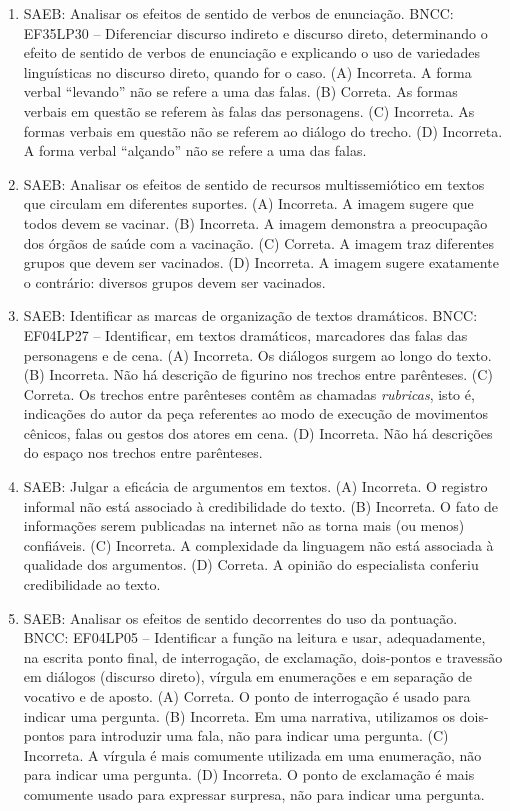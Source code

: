 \begin{enumerate}
\item
SAEB: Analisar os efeitos de sentido de verbos de enunciação. BNCC: EF35LP30 -- Diferenciar discurso indireto e discurso direto, determinando o efeito de sentido de verbos de enunciação e explicando o uso de variedades linguísticas no discurso direto, quando for o caso. 
(A) Incorreta. A forma verbal ``levando'' não se refere a uma das falas. 
(B) Correta. As formas verbais em questão se referem às falas das personagens. 
(C) Incorreta. As formas verbais em questão não se referem ao diálogo do trecho. 
(D) Incorreta. A forma verbal  ``alçando'' não se refere a uma das falas.

\item
SAEB: Analisar os efeitos de sentido de recursos multissemiótico em textos que circulam em diferentes suportes. 
(A) Incorreta. A imagem sugere que todos devem se vacinar. 
(B) Incorreta.  A imagem demonstra a preocupação dos órgãos de saúde com a vacinação. 
(C) Correta. A imagem traz diferentes grupos que devem ser vacinados. 
(D) Incorreta. A imagem sugere exatamente o contrário: diversos grupos devem ser vacinados.

\item
SAEB: Identificar as marcas de organização de textos dramáticos. BNCC: EF04LP27 -- Identificar, em textos dramáticos, marcadores das falas das personagens e de cena.
(A) Incorreta. Os diálogos surgem ao longo do texto. 
(B) Incorreta. Não há descrição de figurino nos trechos entre parênteses. 
(C) Correta. Os trechos entre parênteses contêm as chamadas \textit{rubricas}, isto é, indicações do autor da peça referentes ao modo de execução de movimentos cênicos, falas ou gestos dos atores em cena. 
(D) Incorreta. Não há descrições do espaço nos trechos entre parênteses.

\item
SAEB: Julgar a eficácia de argumentos em textos. 
(A) Incorreta. O registro informal não está associado à credibilidade do texto. 
(B) Incorreta. O fato de informações serem publicadas na internet não as torna mais (ou menos) confiáveis. 
(C) Incorreta. A complexidade da linguagem não está associada à qualidade dos argumentos. 
(D) Correta. A opinião do especialista conferiu credibilidade ao texto.

\item
SAEB: Analisar os efeitos de sentido decorrentes do uso da pontuação. BNCC: EF04LP05 -- Identificar a função na leitura e usar, adequadamente, na escrita ponto final, de interrogação, de exclamação, dois-pontos e travessão em diálogos (discurso direto), vírgula em enumerações e em separação de vocativo e de aposto. 
(A) Correta. O ponto de interrogação é usado para indicar uma pergunta. 
(B) Incorreta. Em uma narrativa, utilizamos os dois-pontos para introduzir uma fala, não para indicar uma pergunta. 
(C) Incorreta. A vírgula é mais comumente utilizada em uma enumeração, não para indicar uma pergunta. 
(D) Incorreta. O ponto de exclamação é mais comumente usado para expressar surpresa, não para indicar uma pergunta.


\end{enumerate}
